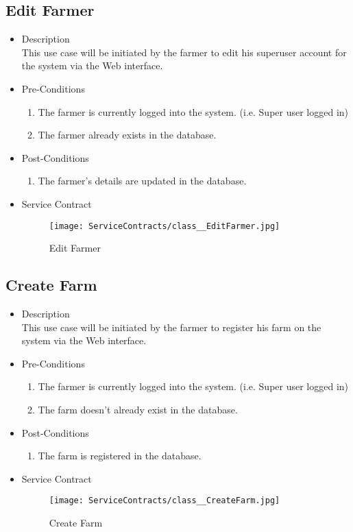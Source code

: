 \documentclass[11pt,fleqn]{book} %
\begin{document}
\subsection{Edit Farmer}
\begin{itemize}
	\item Description\\
	This use case will be initiated by the farmer to edit his superuser account for the system via the Web interface.
	\item Pre-Conditions
	\begin{enumerate}
		\item The farmer is currently logged into the system. (i.e. Super user logged in)
		\item The farmer already exists in the database.					
	\end{enumerate}
	\item Post-Conditions
	\begin{enumerate}
		\item The farmer’s details are updated in the database.
	\end{enumerate}
	\item Service Contract
	\begin{figure}
		\texttt{[image: ServiceContracts/class\_\_EditFarmer.jpg]}
		\caption{Edit Farmer}
	\end{figure}
\end{itemize}

\subsection{Create Farm}
\begin{itemize}
	\item Description\\
	This use case will be initiated by the farmer to register his farm on the system via the Web interface.
	\item Pre-Conditions
	\begin{enumerate}
		\item The farmer is currently logged into the system. (i.e. Super user logged in)
		\item The farm doesn’t already exist in the database.
	\end{enumerate}
	\item Post-Conditions
	\begin{enumerate}
		\item The farm is registered in the database.
	\end{enumerate}
	\item Service Contract
	\begin{figure}
		\texttt{[image: ServiceContracts/class\_\_CreateFarm.jpg]}
		\caption{Create Farm}
	\end{figure}
\end{itemize}
\end{document}

